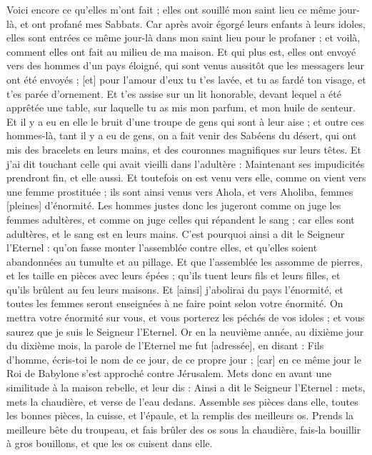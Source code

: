 \begin{multicols}{2}
Voici encore ce qu'elles m'ont fait ; elles ont souillé mon saint lieu ce même jour-là, et ont profané mes Sabbats.
Car après avoir égorgé leurs enfants à leurs idoles, elles sont entrées ce même jour-là dans mon saint lieu pour le profaner ; et voilà, comment elles ont fait au milieu de ma maison.
Et qui plus est, elles ont envoyé vers des hommes d'un pays éloigné, qui sont venus aussitôt que les messagers leur ont été envoyés ; [et] pour l'amour d'eux tu t'es lavée, et tu as fardé ton visage, et t'es parée d'ornement.
Et t'es assise sur un lit honorable, devant lequel a été apprêtée une table, sur laquelle tu as mis mon parfum, et mon huile de senteur.
Et il y a eu en elle le bruit d'une troupe de gens qui sont à leur aise ; et outre ces hommes-là, tant il y a eu de gens, on a fait venir des Sabéens du désert, qui ont mis des bracelets en leurs mains, et des couronnes magnifiques sur leurs têtes.
Et j'ai dit touchant celle qui avait vieilli dans l'adultère : Maintenant ses impudicités prendront fin, et elle aussi.
Et toutefois on est venu vers elle, comme on vient vers une femme prostituée ; ils sont ainsi venus vers Ahola, et vers Aholiba, femmes [pleines] d'énormité.
Les hommes justes donc les jugeront comme on juge les femmes adultères, et comme on juge celles qui répandent le sang ; car elles sont adultères, et le sang est en leurs mains.
C'est pourquoi ainsi a dit le Seigneur l'Eternel : qu'on fasse monter l'assemblée contre elles, et qu'elles soient abandonnées au tumulte et au pillage.
Et que l'assemblée les assomme de pierres, et les taille en pièces avec leurs épées ; qu'ils tuent leurs fils et leurs filles, et qu'ils brûlent au feu leurs maisons.
Et [ainsi] j'abolirai du pays l'énormité, et toutes les femmes seront enseignées à ne faire point selon votre énormité.
On mettra votre énormité sur vous, et vous porterez les péchés de vos idoles ; et vous saurez que je suis le Seigneur l'Eternel.
\VerseOne{}Or en la neuvième année, au dixième jour du dixième mois, la parole de l'Eternel me fut [adressée], en disant :
Fils d'homme, écris-toi le nom de ce jour, de ce propre jour ; [car] en ce même jour le Roi de Babylone s'est approché contre Jérusalem.
Mets donc en avant une similitude à la maison rebelle, et leur dis : Ainsi a dit le Seigneur l'Eternel : mets, mets la chaudière, et verse de l'eau dedans.
Assemble ses pièces dans elle, toutes les bonnes pièces, la cuisse, et l'épaule, et la remplis des meilleurs os.
Prends la meilleure bête du troupeau, et fais brûler des os sous la chaudière, fais-la bouillir à gros bouillons, et que les os cuisent dans elle.

\end{multicols}
